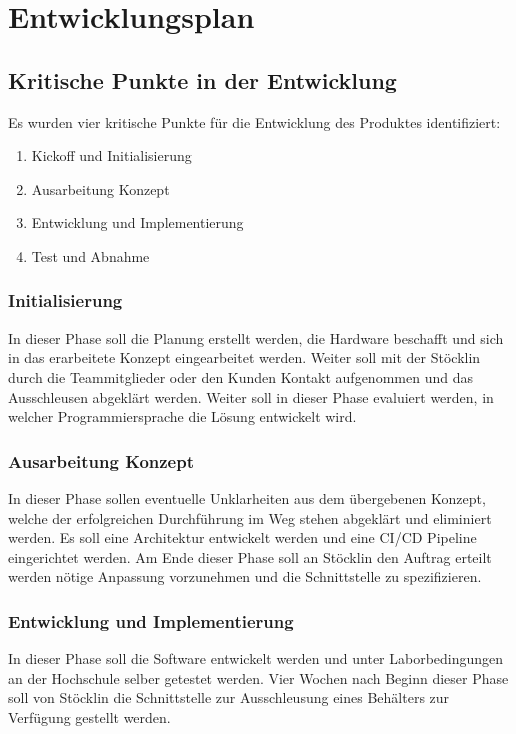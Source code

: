 \chapter{Entwicklungsplan}

\section{Kritische Punkte in der Entwicklung}
Es wurden vier kritische Punkte für die Entwicklung des Produktes identifiziert:
\begin{enumerate}
	\item Kickoff und Initialisierung
	\item Ausarbeitung Konzept
	\item Entwicklung und Implementierung
	\item Test und Abnahme
\end{enumerate}

\subsection{Initialisierung}
In dieser Phase soll die Planung erstellt werden, die Hardware beschafft und sich in das erarbeitete Konzept eingearbeitet werden. Weiter soll mit der Stöcklin durch die Teammitglieder oder den Kunden Kontakt aufgenommen und das Ausschleusen abgeklärt werden. Weiter soll in dieser Phase evaluiert werden, in welcher Programmiersprache die Lösung entwickelt wird.

\subsection{Ausarbeitung Konzept}
In dieser Phase sollen eventuelle Unklarheiten aus dem übergebenen Konzept, welche der erfolgreichen Durchführung im Weg stehen abgeklärt und eliminiert werden. Es soll eine Architektur entwickelt werden und eine CI/CD Pipeline eingerichtet werden. Am Ende dieser Phase soll an Stöcklin den Auftrag erteilt werden nötige Anpassung vorzunehmen und die Schnittstelle zu spezifizieren.

\subsection{Entwicklung und Implementierung}
In dieser Phase soll die Software entwickelt werden und unter Laborbedingungen an der Hochschule selber getestet werden. Vier Wochen nach Beginn dieser Phase soll von Stöcklin die Schnittstelle zur Ausschleusung eines Behälters zur Verfügung gestellt werden.

